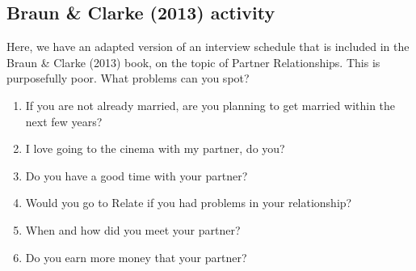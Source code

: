 \documentclass[
  english,
  letterpaper,
  DIV=11,
  numbers=noendperiod]{scrreprt}
\providecommand{\tightlist}{%
  \setlength{\itemsep}{0pt}\setlength{\parskip}{0pt}}
\begin{document}
\subsection{Braun \& Clarke (2013)
activity}\label{braun-clarke-2013-activity}

Here, we have an adapted version of an interview schedule that is
included in the Braun \& Clarke (2013) book, on the topic of Partner
Relationships. This is purposefully poor. What problems can you spot?

\begin{enumerate}
\def\labelenumi{\arabic{enumi}.}
\tightlist
\item
  If you are not already married, are you planning to get married within
  the next few years?
\item
  I love going to the cinema with my partner, do you?
\item
  Do you have a good time with your partner?
\item
  Would you go to Relate if you had problems in your relationship?
\item
  When and how did you meet your partner?
\item
  Do you earn more money that your partner?
\end{enumerate}
\end{document}
